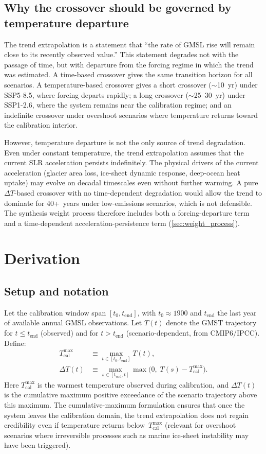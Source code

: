 \documentclass[11pt]{article}
\newcommand{\dT}{\Delta T}
\newcommand{\tcal}{T_{\mathrm{cal}}^{\max}}
\newcommand{\tend}{t_{\mathrm{end}}}
\begin{document}
\subsection{Why the crossover should be governed by temperature departure}

The trend extrapolation is a statement that ``the rate of GMSL rise will remain close to its recently observed value.''  This statement degrades not with the passage of time, but with departure from the forcing regime in which the trend was estimated.  A time-based crossover gives the same transition horizon for all scenarios.  A temperature-based crossover gives a short crossover ($\sim$10~yr) under SSP5-8.5, where forcing departs rapidly; a long crossover ($\sim$25--30~yr) under SSP1-2.6, where the system remains near the calibration regime; and an indefinite crossover under overshoot scenarios where temperature returns toward the calibration interior.

However, temperature departure is not the only source of trend degradation.  Even under constant temperature, the trend extrapolation assumes that the current SLR acceleration persists indefinitely.  The physical drivers of the current acceleration (glacier area loss, ice-sheet dynamic response, deep-ocean heat uptake) may evolve on decadal timescales even without further warming.  A pure $\dT$-based crossover with no time-dependent degradation would allow the trend to dominate for 40+~years under low-emissions scenarios, which is not defensible.  The synthesis weight process therefore includes both a forcing-departure term and a time-dependent acceleration-persistence term (\cref{sec:weight_process}).


\section{Derivation}

\subsection{Setup and notation}

Let the calibration window span $[t_0, \tend]$, with $t_0 \approx 1900$ and $\tend$ the last year of available annual GMSL observations.  Let $T(t)$ denote the GMST trajectory for $t \le \tend$ (observed) and for $t > \tend$ (scenario-dependent, from CMIP6/IPCC).  Define:
\begin{align}
  \tcal &\equiv \max_{t \in [t_0, \tend]} T(t), \label{eq:Tcalmax} \\
  \dT(t) &\equiv \max_{s \in [\tend, t]} \max\!\big(0,\; T(s) - \tcal\big). \label{eq:deltaT_def}
\end{align}
Here $\tcal$ is the warmest temperature observed during calibration, and $\dT(t)$ is the cumulative maximum positive exceedance of the scenario trajectory above this maximum.  The cumulative-maximum formulation ensures that once the system leaves the calibration domain, the trend extrapolation does not regain credibility even if temperature returns below~$\tcal$ (relevant for overshoot scenarios where irreversible processes such as marine ice-sheet instability may have been triggered).
\end{document}
